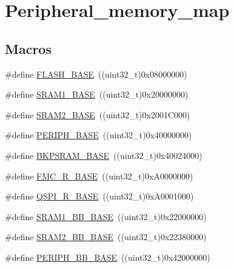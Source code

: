 \hypertarget{group___peripheral__memory__map}{}\section{Peripheral\+\_\+memory\+\_\+map}
\label{group___peripheral__memory__map}
\subsection*{Macros}
\begin{DoxyCompactItemize}
\item 
\#define \hyperlink{group___peripheral__memory__map_ga23a9099a5f8fc9c6e253c0eecb2be8db}{F\+L\+A\+S\+H\+\_\+\+B\+A\+SE}~((uint32\+\_\+t)0x08000000)
\item 
\#define \hyperlink{group___peripheral__memory__map_ga7d0fbfb8894012dbbb96754b95e562cd}{S\+R\+A\+M1\+\_\+\+B\+A\+SE}~((uint32\+\_\+t)0x20000000)
\item 
\#define \hyperlink{group___peripheral__memory__map_gadbb42a3d0a8a90a79d2146e4014241b1}{S\+R\+A\+M2\+\_\+\+B\+A\+SE}~((uint32\+\_\+t)0x2001\+C000)
\item 
\#define \hyperlink{group___peripheral__memory__map_ga9171f49478fa86d932f89e78e73b88b0}{P\+E\+R\+I\+P\+H\+\_\+\+B\+A\+SE}~((uint32\+\_\+t)0x40000000)
\item 
\#define \hyperlink{group___peripheral__memory__map_ga52e57051bdf8909222b36e5408a48f32}{B\+K\+P\+S\+R\+A\+M\+\_\+\+B\+A\+SE}~((uint32\+\_\+t)0x40024000)
\item 
\#define \hyperlink{group___peripheral__memory__map_ga7a599164cd92798542bc6288793d1ed5}{F\+M\+C\+\_\+\+R\+\_\+\+B\+A\+SE}~((uint32\+\_\+t)0x\+A0000000)
\item 
\#define \hyperlink{group___peripheral__memory__map_ga3b6b7d9c67dec50557fd634505198e9d}{Q\+S\+P\+I\+\_\+\+R\+\_\+\+B\+A\+SE}~((uint32\+\_\+t)0x\+A0001000)
\item 
\#define \hyperlink{group___peripheral__memory__map_gac4c4f61082e4b168f29d9cf97dc3ca5c}{S\+R\+A\+M1\+\_\+\+B\+B\+\_\+\+B\+A\+SE}~((uint32\+\_\+t)0x22000000)
\item 
\#define \hyperlink{group___peripheral__memory__map_gac33cb6edadf184ab9860d77089503922}{S\+R\+A\+M2\+\_\+\+B\+B\+\_\+\+B\+A\+SE}~((uint32\+\_\+t)0x22380000)
\item 
\#define \hyperlink{group___peripheral__memory__map_gaed7efc100877000845c236ccdc9e144a}{P\+E\+R\+I\+P\+H\+\_\+\+B\+B\+\_\+\+B\+A\+SE}~((uint32\+\_\+t)0x42000000)

\end{DoxyCompactItemize}
